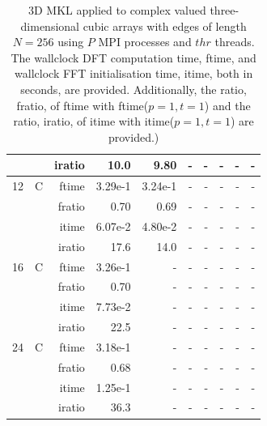 \documentclass[a4paper]{article}
\begin{document}
\begin{table}[htbp]
\begin{center}
\begin{small}
\begin{tabular}{|r|r|r|r|r|r|r|r|r|r|}
             &             &  iratio &    10.0 &   9.80  &      - &      - &      - &      - &      - \\\hline
   12 &   C &  ftime &    3.29e-1 &    3.24e-1 &      - &      - &      - &      - &      - \\
             &             &  fratio &    0.70 &    0.69 &      - &      - &      - &      - &      - \\
             &             &  itime &    6.07e-2 &    4.80e-2 &      - &      - &      - &      - &      - \\
             &             &  iratio &    17.6 &   14.0 &     - &      - &      - &      - &      - \\\hline
   16 &   C &  ftime &    3.26e-1 &      - &      - &      - &      - &      - &      - \\
             &             &  fratio &    0.70 &      - &      - &      - &      - &      - &      - \\
             &             &  itime &    7.73e-2 &      - &      - &      - &      - &      - &      - \\
             &             &  iratio &   22.5 &     - &      - &      - &      - &      - &      - \\\hline
   24 &   C &  ftime &    3.18e-1 &      - &      - &      - &      - &      - &      - \\
             &             &  fratio &    0.68 &      - &      - &      - &      - &      - &      - \\
             &             &  itime &    1.25e-1 &      - &      - &      - &      - &      - &      - \\
             &             &  iratio &    36.3 &     - &      - &      - &      - &      - &      - \\\hline

\end{tabular}
\caption{3D MKL applied to complex valued three-dimensional cubic arrays with edges of length $N=256$ using $P$ MPI processes and $thr$ threads. The wallclock DFT computation time, ftime, and wallclock FFT initialisation time, itime, both in seconds, are provided. Additionally, the ratio, fratio, of ftime  with ftime($p=1,t=1$) and the ratio, iratio, of itime  with itime($p=1,t=1$) are provided.) }\label{Tbl:MKL3d256c}
\end{small}
\end{center}
\end{table}
\end{document}
